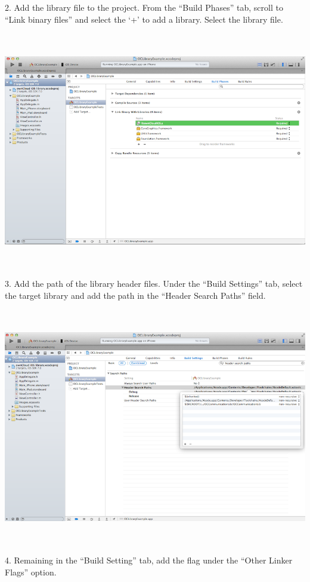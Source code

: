 \documentclass[letterpaper,10pt,english]{sphinxmanual}
\begin{document}
2.  Add the library file to the project.  From the “Build Phases” tab, scroll
to “Link binary files” and select the ‘+’ to add a library.  Select the library
file.

\includegraphics[width=16.51cm,height=10.329cm]{10000201000003480000020EC688993D.png}

3.  Add the path of the library header files.  Under the “Build Settings” tab,
select the target library and add the path in the “Header Search Paths” field.

\includegraphics[width=16.51cm,height=10.358cm]{10000201000003430000020C65A3C5A7.png}

4.  Remaining in the “Build Setting” tab, add the flag  under the
“Other Linker Flags” option.
\end{document}
